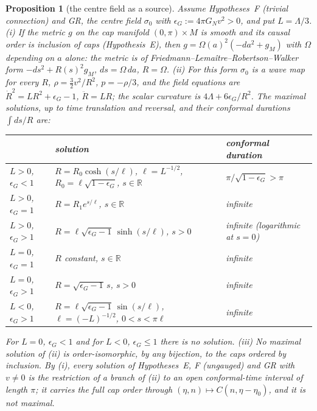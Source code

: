 \documentclass[aps,pra,onecolumn,superscriptaddress,nofootinbib,10pt]{revtex4-2}
\newtheorem{proposition}[theorem]{Proposition}
\theoremstyle{definition}
\theoremstyle{remark}
\newcommand{\R}{\mathbb{R}}
\begin{document}
\begin{proposition}[the centre field as a source]\label{prop:friedmann}
Assume Hypotheses~F (trivial connection) and GR, the centre field $\sigma_0$ with $\epsilon_G:=4\pi G_Nv^2>0$, and
put $L=\Lambda/3$.
(i) If the metric $g$ on the cap manifold $(0,\pi)\times M$ is smooth and its causal order is inclusion of caps
(Hypothesis~E), then $g=\Omega(a)^2(-da^2+g_M)$ with $\Omega$ depending on $a$ alone: the metric is of
Friedmann--Lema\^itre--Robertson--Walker form $-ds^2+R(s)^2g_M$, $ds=\Omega\,da$, $R=\Omega$.
(ii) For this form $\sigma_0$ is a wave map for every $R$, $\rho=\tfrac32v^2/R^2$, $p=-\rho/3$, and the field
equations are $\dot R^2=LR^2+\epsilon_G-1$, $\ddot R=LR$; the scalar curvature is $4\Lambda+6\epsilon_G/R^2$.  The maximal
solutions, up to time translation and reversal, and their conformal durations $\int ds/R$ are:
\begin{center}\footnotesize
\begin{tabular}{@{}lll@{}}
\toprule
& solution & conformal duration\\
\midrule
$L>0$, $\epsilon_G<1$ & $R=R_0\cosh(s/\ell)$, $\ell=L^{-1/2}$, $R_0=\ell\sqrt{1-\epsilon_G}$, $s\in\R$ & $\pi/\sqrt{1-\epsilon_G}>\pi$\\
$L>0$, $\epsilon_G=1$ & $R=R_1e^{s/\ell}$, $s\in\R$ & infinite\\
$L>0$, $\epsilon_G>1$ & $R=\ell\sqrt{\epsilon_G-1}\,\sinh(s/\ell)$, $s>0$ & infinite (logarithmic at $s=0$)\\
$L=0$, $\epsilon_G=1$ & $R$ constant, $s\in\R$ & infinite\\
$L=0$, $\epsilon_G>1$ & $R=\sqrt{\epsilon_G-1}\,s$, $s>0$ & infinite\\
$L<0$, $\epsilon_G>1$ & $R=\ell\sqrt{\epsilon_G-1}\,\sin(s/\ell)$, $\ell=(-L)^{-1/2}$, $0<s<\pi\ell$ & infinite\\
\bottomrule
\end{tabular}
\end{center}
For $L=0$, $\epsilon_G<1$ and for $L<0$, $\epsilon_G\le1$ there is no solution.
(iii) No maximal solution of (ii) is order-isomorphic, by any bijection, to the caps ordered by
inclusion.  By (i), every solution of Hypotheses~E, F (ungauged) and GR with $v\ne0$ is the restriction of a
branch of (ii) to an open conformal-time interval of length $\pi$; it carries the full cap order through
$(\eta,n)\mapsto C(n,\eta-\eta_0)$, and it is not maximal.
\end{proposition}
\end{document}
